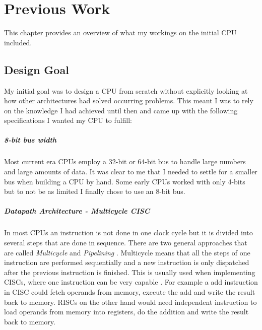
\chapter{Previous Work}\label{cha:prev}
This chapter provides an overview of what my workings on the initial \gls{CPU} included.

\section{Design Goal}
My initial goal was to design a \gls{CPU} from scratch without explicitly looking at how other architectures had solved occurring problems.
This meant I was to rely on the knowledge I had achieved until then and came up with the following specifications I wanted my \gls{CPU} to fulfill:
\paragraph{8-bit bus width}
Most current era \glspl{CPU} employ a 32-bit or 64-bit bus to handle large numbers and large amounts of data.
It was clear to me that I needed to settle for a smaller bus when building a \gls{CPU} by hand.
Some early \glspl{CPU} worked with only 4-bits but to not be as limited I finally chose to use an 8-bit bus.
\paragraph{Datapath Architecture - Multicycle CISC}
In most \glspl{CPU} an instruction is not done in one clock cycle but it is divided into several steps that are done in sequence.
There are two general approaches that are called \emph{Multicycle} and \emph{Pipelining} \cite{PattersonDavid2016RuRD}.
Multicycle means that all the steps of one instruction are performed sequentially and a new instruction is only dispatched after the previous instruction is finished.
This is usually used when implementing \glspl{CISC}, where one instruction can be very capable \cite{chen_novick_shimano_2000}.
For example a add instruction in \gls{CISC} could fetch operands from memory, execute the add and write the result back to memory.
\glspl{RISC} on the other hand would need independent instruction to load operands from memory into registers, do the addition and write the result back to memory.

